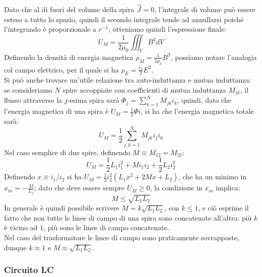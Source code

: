 Dato che al di fuori del volume della spira $ \vec{J} = 0 $, l'integrale di volume può essere esteso a tutto lo spazio, quindi il secondo integrale tende ad annullarsi poiché l'integrando è proporzionale a $ r^{-1} $; otteniamo quindi l'espressione finale:
\begin{equation}
	U_M = \frac{1}{2\mu_0} \iiint_V B^2 dV
	\label{eq:37}
\end{equation}
%
Definendo la densità di energia magnetica $ \rho_M = \frac{1}{2\mu_0}B^2 $, possiamo notare l'analogia col campo elettrico, per il quale si ha $ \rho_E = \frac{\epsilon_0}{2}E^2 $. \\ 
%
Si può anche trovare un'utile relazione tra auto-induttanza e mutua induttanza: se consideriamo $ N $ spire accoppiate con coefficienti di mutua induttanza $ M_{jk} $, il flusso attraverso la $ j $-esima spira sarà $ \Phi_j  = \sum_{k=1}^{N} M_{jk}i_k $, quindi, dato che l'energia magnetica di una spira è $ U_M = \frac{1}{2}\Phi i $, si ha che l'energia magnetica totale sarà:
\begin{equation}
	U_M = \frac{1}{2} \displaystyle\sum_{j,k=1}^{N} M_{jk} i_j i_k
	\label{eq:38}
\end{equation}
Nel caso semplice di due spire, definendo $ M \equiv M_{12} = M_{21} $:
\begin{equation}
	U_M = \frac{1}{2} L_1 i_1^2 + M i_1 i_2 + \frac{1}{2} L_2 i_2^2
	\label{eq:39}
\end{equation}
Definendo $ x \equiv i_1 / i_2 $ si ha $ U_M = \frac{1}{2} i_2^2 (L_1 x^2 + 2Mx + L_2) $, che ha un minimo in $ x_m = -\frac{M}{L_1} $; dato che deve essere sempre $ U_M \ge 0 $, la condizione in $ x_m $ implica:
\begin{equation}
	M \le \sqrt{L_1 L_2}
	\label{eq:40}
\end{equation}
%
In generale è quindi possibile scrivere $ M = k \sqrt{L_1 L_2} $, con $ k \le 1 $, e ciò esprime il fatto che non tutte le linee di campo di una spira sono concatenate all'altra: più $ k $ è vicino ad $ 1 $, più sono le linee di campo concatenate. \\ 
Nel caso del trasformatore le linee di campo sono praticamente sovrapposte, dunque $ k \approx 1 $ e $ M \approx \sqrt{L_1 L_2} $.

\subsubsection{Circuito LC}

